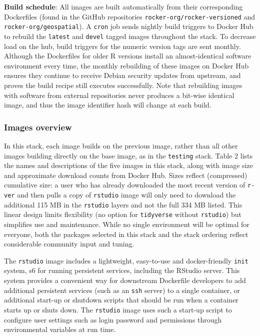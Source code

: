 \textbf{Build schedule}: All images are built automatically from their
corresponding Dockerfiles (found in the GitHub repositories
\texttt{rocker-org/rocker-versioned} and
\texttt{rocker-org/geospatial}). A \texttt{cron} job sends nightly build
triggers to Docker Hub to rebuild the \texttt{latest} and \texttt{devel}
tagged images throughout the stack. To decrease load on the hub, build
triggers for the numeric version tags are sent monthly. Although the
Dockerfiles for older R versions install an almost-identical software
environment every time, the monthly rebuilding of these images on Docker
Hub ensures they continue to receive Debian security updates from
upstream, and proves the build recipe still executes successfully. Note
that rebuilding images with software from external repositories never
produces a bit-wise identical image, and thus the image identifier hash
will change at each build.

\subsubsection{Images overview}\label{images-overview-1}

In this stack, each image builds on the previous image, rather than all
other images building directly on the base image, as in the
\texttt{testing} stack. Table 2 lists the names and descriptions of the
five images in this stack, along with image size and approximate
download counts from Docker Hub. Sizes reflect (compressed) cumulative
size: a user who has already downloaded the most recent version of
\texttt{r-ver} and then pulls a copy of \texttt{rstudio} image will only
need to download the additional 115 MB in the \texttt{rstudio} layers
and not the full 334 MB listed. This linear design limits flexibility
(no option for \texttt{tidyverse} without \texttt{rstudio}) but
simplifies use and maintenance. While no single environment will be
optimal for everyone, both the packages selected in this stack and the
stack ordering reflect considerable community input and tuning.

The \texttt{rstudio} image includes a lightweight, easy-to-use and
docker-friendly \texttt{init} system, s6 \citep{s6} for running
persistent services, including the
RStudio\textsuperscript{\textregistered} server. This system provides a
convenient way for downstream Dockerfile developers to add additional
persistent services (such as an \texttt{ssh} server) to a single
container, or additional start-up or shutdown scripts that should be run
when a container starts up or shuts down. The \texttt{rstudio} image
uses such a start-up script to configure user settings such as login
password and permissions through environmental variables at run time.

